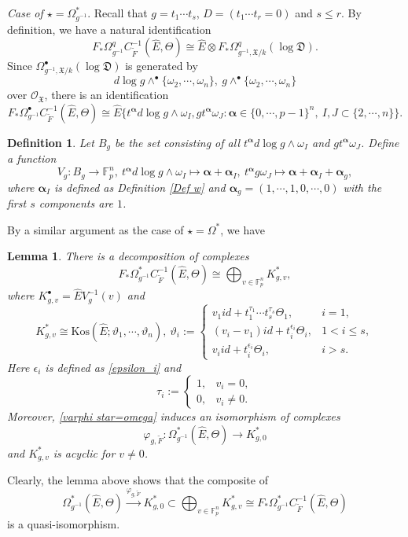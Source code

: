 \documentclass[12pt, a4paper]{article}
\newtheorem{definition}{Definition}[section]
\newtheorem{lemma}{Lemma}[section]
\begin{document}
\emph{Case of $\star=\Omega^*_{g^{-1}}$}. Recall that $g=t_1\cdots t_s$, $D=(t_1\cdots t_r=0)$ and $s\leq r$. By definition, we have a natural identification
$$
F_*\Omega^q_{g^{-1}}C^{-1}_{\tilde F}(\hat E,\Theta)\cong\hat E\otimes F_*\Omega^q_{g^{-1},\mathfrak X/k}(\log\mathfrak D).
$$
Since $\Omega^\bullet_{g^{-1},\mathfrak X/k}(\log\mathfrak D)$ is generated by
$$
d\log g\wedge^\bullet\{\omega_2,\cdots,\omega_n\},~g\wedge^\bullet\{\omega_2,\cdots,\omega_n\}
$$
over $\mathcal O_{\mathfrak X}$, there is an identification
$$
F_*\Omega^\bullet_{g^{-1}}C_{\tilde F}^{-1}(\hat E,\Theta)\cong\hat E\{t^{\boldsymbol{\alpha}}d\log g\wedge\omega_I,gt^{\boldsymbol{\alpha}}\omega_J:\boldsymbol{\alpha}\in\{0,\cdots,p-1\}^n,~I,J\subset\{2,\cdots,n\}\}.
$$
\begin{definition}
Let $B_g$ be the set consisting of all $t^{\boldsymbol{\alpha}}d\log g\wedge\omega_I$ and $gt^{\boldsymbol{\alpha}}\omega_J$. Define a function 
$$
V_g:B_g\to\mathbb F_p^n,~
t^{\boldsymbol{\alpha}}d\log g\wedge\omega_I\mapsto \boldsymbol{\alpha}+\boldsymbol{\alpha}_I,~t^{\boldsymbol{\alpha}}g\omega_J\mapsto\boldsymbol{\alpha}+\boldsymbol{\alpha}_I+\boldsymbol{\alpha}_g,
$$
where $\boldsymbol{\alpha}_I$ is defined as Definition \ref{Def w} and $\boldsymbol{\alpha}_g=(1,\cdots,1,0,\cdots,0)$ with the first $s$ components are $1$.
\end{definition}
By a similar argument as the case of $\star=\Omega^*$, we have
\begin{lemma}
There is a decomposition of complexes
$$
F_*\Omega_{g^{-1}}^*C_{\tilde F}^{-1}(\hat E,\Theta)\cong\bigoplus_{v\in\mathbb F_p^n}K_{g,v}^*,
$$
where $K_{g,v}^\bullet=\hat EV^{-1}_g(v)$ and 
$$K_{g,v}^*\cong\mathrm{Kos}(\hat E;\vartheta_1,\cdots,\vartheta_n),~\vartheta_i:=\left\{
\begin{matrix}
 v_1id+t_1^{\tau_1}\cdots t_s^{\tau_s}\Theta_1,&i=1,\\
 (v_i-v_1)id+t_i^{\epsilon_i}\Theta_i,&1<i\leq s,\\
 v_iid+t_i^{\epsilon_i}\Theta_i,&i>s.
\end{matrix}
\right.
$$
Here $\epsilon_i$ is defined as \eqref{epsilon_i} and
$$
\tau_i:=\left\{
\begin{matrix}
1,&v_i=0,\\
0,&v_i\neq0.
\end{matrix}
\right.
$$
Moreover, \eqref{varphi star=omega} induces an isomorphism of complexes
$$
\varphi_{g,\tilde F}:\Omega^*_{g^{-1}}(\hat E,\Theta)\to K^*_{g,0}
$$
and $K^*_{g,v}$ is acyclic for $v\neq0$.
\end{lemma}
Clearly, the lemma above shows that the composite of
$$\Omega_{g^{-1}}^*(\hat E,\Theta)\stackrel{\varphi_{g,\tilde F}}{\to}K_{g,0}^*\subset\bigoplus_{v\in\mathbb F_p^n}K_{g,v}^*\cong F_*\Omega_{g^{-1}}^*C_{\tilde F}^{-1}(\hat E,\Theta)$$ 
is a quasi-isomorphism.
\end{document}
